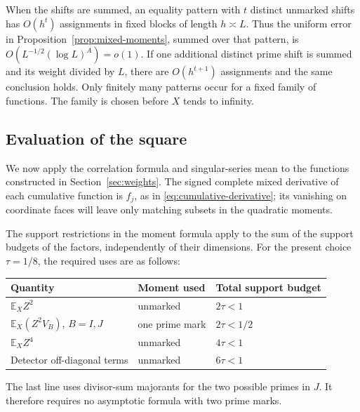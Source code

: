When the shifts are summed, an equality pattern with $t$ distinct unmarked shifts has
$O(h^t)$ assignments in fixed blocks of length $h\asymp L$. Thus the uniform
error in Proposition~\ref{prop:mixed-moments}, summed over that pattern,
is $O(L^{-1/2}(\log L)^A)=o(1)$. If one additional distinct prime shift is
summed and its weight divided by $L$, there are $O(h^{t+1})$ assignments and
the same conclusion holds. Only finitely many patterns occur for a fixed
family of functions. The family is chosen before $X$ tends to infinity.

\subsection{Evaluation of the square}\label{sec:weight-moment-proof}

We now apply the correlation formula and singular-series mean to the
functions constructed in Section~\ref{sec:weights}. The signed complete
mixed derivative of each cumulative function is $f_j$, as in
\eqref{eq:cumulative-derivative}; its vanishing on coordinate faces will
leave only matching subsets in the quadratic moments.

The support restrictions in the moment formula apply to the sum of
the support budgets of the factors, independently of their dimensions.
For the present choice $\tau=1/8$, the required uses are as follows:
\begin{center}
\begin{tabular}{lll}
Quantity & Moment used & Total support budget\\
\hline
$\mathbb E_XZ^2$ & unmarked & $2\tau<1$\\
$\mathbb E_X(Z^2V_B)$, $B=I,J$ & one prime mark & $2\tau<1/2$\\
$\mathbb E_XZ^4$ & unmarked & $4\tau<1$\\
Detector off-diagonal terms & unmarked & $6\tau<1$
\end{tabular}
\end{center}
The last line uses divisor-sum majorants for the two possible primes
in $J$. It therefore requires no asymptotic formula with two prime marks.

